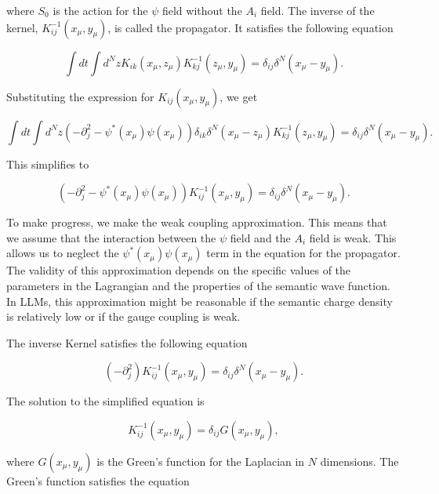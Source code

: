 \documentclass[prd,amsmath,amssymb,12pt]{revtex4}
\begin{document}
\noindent
where $S_0$ is the action for the $\psi$ field without the $A_i$ field.
The inverse of the kernel, $K^{-1}_{ij}(x_{\mu},y_{\mu})$, is called the propagator.
It satisfies the following equation

\begin{equation}
    \int dt \int d^{N}z K_{ik}(x_{\mu},z_{\mu}) K^{-1}_{kj}(z_{\mu},y_{\mu}) = \delta_{ij} \delta^N(x_{\mu}-y_{\mu}).
\end{equation}

\noindent
Substituting the expression for $K_{ij}(x_{\mu},y_{\mu})$, we get

\begin{equation}
    \int dt \int d^{N}z (-\partial_j^2 - \psi^*(x_{\mu}) \psi(x_{\mu})) \delta_{ik}
    \delta^N(x_{\mu}-z_{\mu}) K^{-1}_{kj}(z_{\mu},y_{\mu}) = \delta_{ij} \delta^N(x_{\mu}-y_{\mu}).
\end{equation}

\noindent
This simplifies to

\begin{equation}
    (-\partial_j^2 - \psi^*(x_{\mu}) \psi(x_{\mu})) K^{-1}_{ij}(x_{\mu},y_{\mu})
    = \delta_{ij} \delta^N(x_{\mu}-y_{\mu}).
\end{equation}

\noindent
To make progress, we make the weak coupling approximation. This means that we assume that the interaction
between the $\psi$ field and the $A_i$ field is weak. This allows us to neglect the $\psi^*(x_{\mu}) \psi(x_{\mu})$
term in the equation for the propagator. The validity of this approximation depends on the specific values
of the parameters in the Lagrangian and the properties of the semantic wave function. In LLMs, this
approximation might be reasonable if the semantic charge density is relatively low or if the gauge coupling is weak.

The inverse Kernel satisfies the following equation

\begin{equation}
    (-\partial_j^2) K^{-1}_{ij}(x_{\mu},y_{\mu}) = \delta_{ij} \delta^N(x_{\mu}-y_{\mu}).
\end{equation}

\noindent
The solution to the simplified equation is

\begin{equation}
    K^{-1}_{ij}(x_{\mu},y_{\mu}) = \delta_{ij} G(x_{\mu},y_{\mu}),
\end{equation}

\noindent
where $G(x_{\mu},y_{\mu})$ is the Green's function for the Laplacian in $N$ dimensions.
The Green's function satisfies the equation
\end{document}
